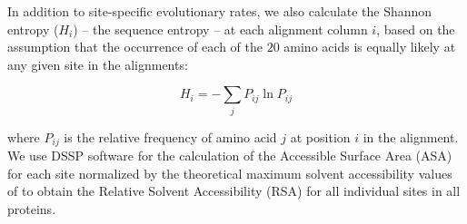 \documentclass[11pt]{article}
\newcommand{\ddg}{$\Delta\Delta G~$}
\begin{document}
    In addition to site-specific evolutionary rates, we also calculate the Shannon entropy ($H_i$) -- the sequence entropy \citep[][]{shenkin_information-theoretical_1991} -- at each alignment column $i$, based on the assumption that the occurrence of each of the $20$ amino acids is equally likely at any given site in the alignments:

    \begin{equation}
        \label{eqn:shannon}
        H_i = -\sum_j P_{ij}\ln P_{ij}
    \end{equation}

    where $P_{ij}$ is the relative frequency of amino acid $j$ at position $i$ in the alignment. We use DSSP software \citep[][]{kabsch_dictionary_1983} for the calculation of the Accessible Surface Area (ASA) for each site normalized by the theoretical maximum solvent accessibility values of \citet{tien_maximum_2013} to obtain the Relative Solvent Accessibility (RSA) for all individual sites in all proteins. \\

		
\end{document}
